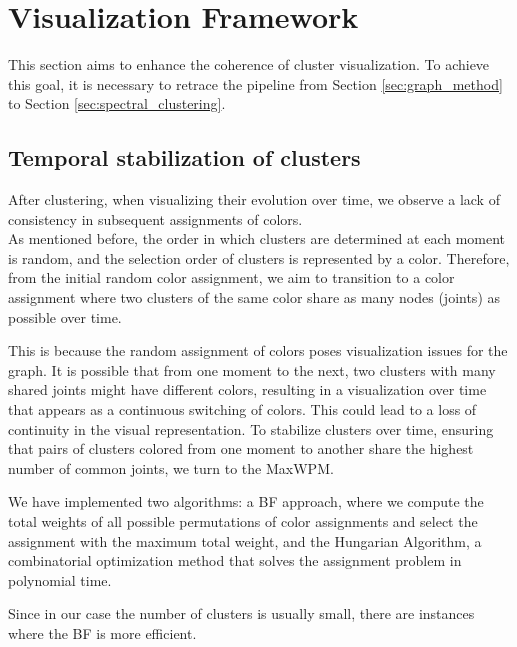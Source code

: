 \clearpage

\section{Visualization Framework}
This section aims to enhance the coherence of cluster visualization.
To achieve this goal, it is necessary to retrace the pipeline from Section \ref{sec:graph_method} to Section \ref{sec:spectral_clustering}.

\subsection{Temporal stabilization of clusters}
\label{subsec:clustering_stabilization}

After clustering, when visualizing their evolution over time, we observe a lack of consistency in subsequent assignments of colors. \\
As mentioned before, the order in which clusters are determined at each moment is random, and the selection order of clusters is represented by a color.
Therefore, from the initial random color assignment, we aim to transition to a color assignment where two clusters of the same color share as many nodes (joints) as possible over time.

This is because the random assignment of colors poses visualization issues for the graph.
It is possible that from one moment to the next, two clusters with many shared joints might have different colors, resulting in a visualization over time that appears as a continuous switching of colors. This could lead to a loss of continuity in the visual representation.
To stabilize clusters over time, ensuring that pairs of clusters colored from one moment to another share the highest number of common joints, we turn to the MaxWPM.

We have implemented two algorithms: a BF approach, where we compute the total weights of all possible permutations of color assignments and select the assignment with the maximum total weight, and the Hungarian Algorithm, a combinatorial optimization method that solves the assignment problem in polynomial time.

Since in our case the number of clusters is usually small, there are instances where the BF is more efficient.

